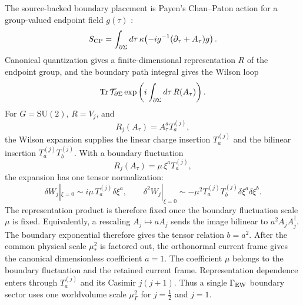 \documentclass[11pt]{article}
\theoremstyle{definition}
\theoremstyle{remark}
\newcommand{\SU}{\mathrm{SU}}
\newcommand{\half}{\tfrac12}
\begin{document}
The source-backed boundary placement is Payen's Chan--Paton action for a
group-valued endpoint field \(g(\tau)\) \cite{Payen2007}:
\[
  S_{\rm CP}
  =
  \int_{\partial\Sigma}d\tau\,
  \kappa\!\left(
  -ig^{-1}(\partial_\tau+A_\tau)g
  \right).
\]
Canonical quantization gives a finite-dimensional representation \(R\) of the
endpoint group, and the boundary path integral gives the Wilson loop
\[
  {\rm Tr}\,{\cal T}_{\partial\Sigma}
  \exp\left(
  i\int_{\partial\Sigma}d\tau\,R(A_\tau)
  \right).
\]
For \(G=\SU(2)\), \(R=V_j\), and
\[
  R_j(A_\tau)=A_\tau^aT_a^{(j)},
\]
the Wilson expansion supplies the linear charge insertion \(T_a^{(j)}\) and
the bilinear insertion \(T_a^{(j)}T_b^{(j)}\).
With a boundary fluctuation
\[
  R_j(A_\tau)=\mu\,\xi^aT_a^{(j)},
\]
the expansion has one tensor normalization:
\[
  \delta W_j|_{\xi=0}\sim i\mu\,T_a^{(j)}\delta\xi^a,
  \qquad
  \delta^2W_j|_{\xi=0}\sim
  -\mu^2T_a^{(j)}T_b^{(j)}\delta\xi^a\delta\xi^b.
\]
The representation product is therefore fixed once the boundary fluctuation
scale \(\mu\) is fixed.  Equivalently, a rescaling \(A_j\mapsto aA_j\)
sends the image bilinear to \(a^2A_jA_j^\dagger\).  The boundary exponential
therefore gives the tensor relation \(b=a^2\).  After the common physical
scale \(\mu_*^2\) is factored out, the orthonormal current frame gives the
canonical dimensionless coefficient \(a=1\).
The coefficient \(\mu\) belongs to the boundary fluctuation and the retained
current frame.  Representation dependence enters through \(T_a^{(j)}\) and
its Casimir \(j(j+1)\).  Thus a single \(\Gamma_{\rm EW}\) boundary sector
uses one worldvolume scale \(\mu_\Gamma^2\) for \(j=\half\) and \(j=1\).
\end{document}
